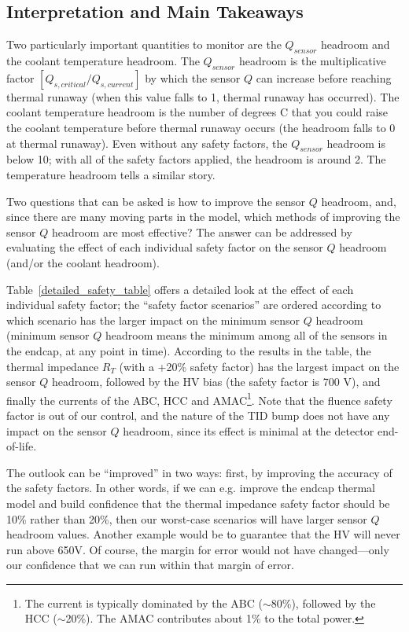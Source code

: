 \clearpage

\subsection{Interpretation and Main Takeaways}

Two particularly important quantities to monitor are the $Q_{sensor}$ headroom and the coolant
temperature headroom. The $Q_{sensor}$ headroom is the multiplicative factor
$[Q_{s,critical}/Q_{s,current}]$ by which the sensor $Q$ can increase before reaching thermal runaway
(when this value falls to 1, thermal runaway has occurred). The coolant temperature headroom is the
number of degrees C that you could raise the coolant temperature before thermal runaway occurs (the
headroom falls to 0 at thermal runaway). Even without any safety factors, the $Q_{sensor}$ headroom
is below 10; with all of the safety factors applied, the headroom is around 2. The temperature
headroom tells a similar story.

Two questions that can be asked is how to improve the sensor $Q$ headroom, and, since there are many
moving parts in the model, which methods of improving the sensor $Q$ headroom are most effective? The
answer can be addressed by evaluating the effect of each individual safety factor on the sensor $Q$
headroom (and/or the coolant headroom).

Table~\ref{detailed_safety_table} offers a detailed look at the effect of each individual safety
factor; the ``safety factor scenarios'' are ordered according to which scenario has the larger impact
on the minimum sensor $Q$ headroom (minimum sensor $Q$ headroom means the minimum among all of the sensors in
the endcap, at any point in time). According to the results in the table, the thermal impedance
$R_T$ (with a +20\% safety factor) has the largest impact on the sensor $Q$ headroom,
followed by the HV bias (the safety factor is 700 V), and finally the
currents of the ABC, HCC and AMAC\footnote{
The current is typically dominated by the ABC ($\sim$80\%), followed by the HCC ($\sim$20\%). The AMAC
contributes about 1\% to the total power.}.
Note that the fluence safety factor is out of our control, and the nature of the TID bump does not
have any impact on the sensor $Q$ headroom, since its effect is minimal at the detector end-of-life.

The outlook can be ``improved'' in two ways: first, by improving the accuracy of the safety factors.
In other words, if we can e.g. improve the endcap thermal model and build confidence that the thermal
impedance safety factor should be 10\% rather than 20\%, then our worst-case scenarios will have
larger sensor $Q$ headroom values. Another example would be to guarantee that the HV will never run
above 650V. Of course, the margin for error would not have changed---only our confidence that we can
run within that margin of error.

